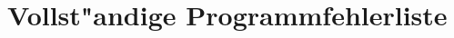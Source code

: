 %



\section{Vollst{"a}ndige Programmfehlerliste}
\label{Anhang:Vollstaendige_Fehlerliste}












